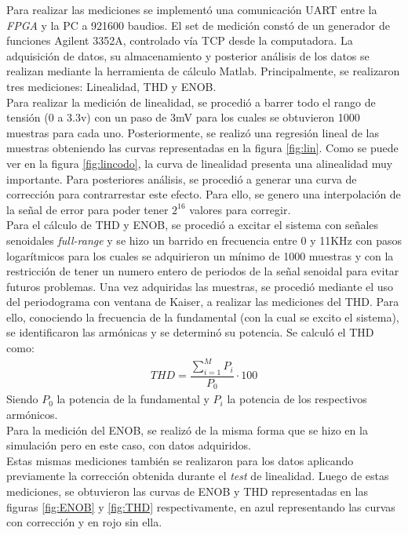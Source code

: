 \documentclass[a4paper,conference]{IEEEtran}
\begin{document}
Para realizar las mediciones se implementó una comunicaci\'on UART entre la \textit{FPGA} y la PC a 921600 baudios. El set de medici\'on const\'o de un generador de funciones Agilent 3352A\cite{AgilentWG}, controlado v\'ia TCP desde la computadora. La adquisición de datos, su almacenamiento y posterior análisis de los datos se realizan mediante la herramienta de cálculo Matlab\textregistered. Principalmente, se realizaron tres mediciones: Linealidad, THD y ENOB.\\
Para realizar la medición de linealidad, se procedió a barrer todo el rango de tensión (0 a 3.3v) con un paso de 3mV para los cuales se obtuvieron 1000 muestras para cada uno. Posteriormente, se realizó una regresión lineal de las muestras obteniendo las curvas representadas en la figura \ref{fig:lin}. Como se puede ver en la figura \ref{fig:lincodo}, la curva de linealidad presenta una alinealidad muy importante. Para posteriores análisis, se procedió a generar una curva de corrección para contrarrestar este efecto. Para ello, se genero una interpolación de la señal de error para poder tener $2^{16}$ valores para corregir.\\
Para el cálculo de THD y ENOB, se procedió a excitar el sistema con señales senoidales \textit{full-range} y se hizo un barrido en frecuencia entre 0 y 11KHz con pasos logarítmicos para los cuales se adquirieron un mínimo de 1000 muestras y con la restricción de tener un numero entero de periodos de la señal senoidal para evitar futuros problemas.
Una vez adquiridas las muestras, se procedió mediante el uso del periodograma con ventana de Kaiser, a realizar las mediciones del THD. Para ello, conociendo la frecuencia de la fundamental (con la cual se excito el sistema), se identificaron las armónicas y se determinó su potencia. Se calculó el THD como:
\begin{align}
THD = \dfrac{\sum_{i=1}^{M}P_i }{P_0}\cdot100
\end{align}
Siendo $P_0$ la potencia de la fundamental y $P_i$ la potencia de los respectivos armónicos.\\
Para la medición del ENOB, se realizó de la misma forma que se hizo en la simulación pero en este caso, con datos adquiridos.\\
Estas mismas mediciones también se realizaron para los datos aplicando previamente la corrección obtenida durante el \textit{test} de linealidad. Luego de estas mediciones, se obtuvieron las curvas de ENOB y THD representadas en las figuras \ref{fig:ENOB} y \ref{fig:THD} respectivamente, en azul representando las curvas con corrección y en rojo sin ella.
\end{document}
